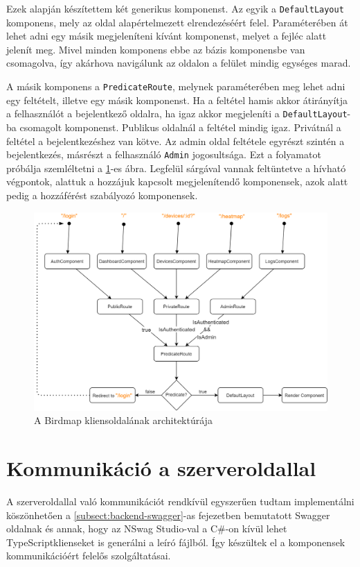 Ezek alapján készítettem két generikus komponenst. Az egyik a \verb+DefaultLayout+ komponens, mely az oldal alapértelmezett elrendezéséért felel.
Paraméterében át lehet adni egy másik megjeleníteni kívánt komponenst, melyet a fejléc alatt jelenít meg.
Mivel minden komponens ebbe az bázis komponensbe van csomagolva, így akárhova navigálunk az oldalon a felület mindig egységes marad.

A másik komponens a \verb+PredicateRoute+, melynek paraméterében meg lehet adni egy feltételt, illetve egy másik komponenst.
Ha a feltétel hamis akkor átirányítja a felhasználót a bejelentkező oldalra, ha igaz akkor megjeleníti a \verb+DefaultLayout+-ba csomagolt komponenst.
Publikus oldalnál a feltétel mindig igaz. 
Privátnál a feltétel a bejelentkezéshez van kötve. 
Az admin oldal feltétele egyrészt szintén a bejelentkezés, másrészt a felhasználó \verb+Admin+ jogosultsága.
Ezt a folyamatot próbálja szemléltetni a \ref{fig:birdmap-frontend-architecture}-es ábra. 
Legfelül sárgával vannak feltüntetve a hívható végpontok, alattuk a hozzájuk kapcsolt megjelenítendő komponensek, azok alatt pedig a hozzáférést szabályozó komponensek.

\begin{figure}[!ht]
    \centering
    \includegraphics[width=150mm, keepaspectratio]{figures/birdmap-frontend-routes.png}
    \caption{A Birdmap kliensoldalának architektúrája}
    \label{fig:birdmap-frontend-architecture}
\end{figure}

\section{Kommunikáció a szerveroldallal}
A szerveroldallal való kommunikációt rendkívül egyszerűen tudtam implementálni köszönhetően a \ref{subsect:backend-swagger}-as fejezetben bemutatott Swagger oldalnak
és annak, hogy az NSwag Studio-val \cite{nswag-studio} a C\#-on kívül lehet TypeScript\footnotemark klienseket is generálni a leíró fájlból.
Így készültek el a komponensek kommunikációért felelős szolgáltatásai.

